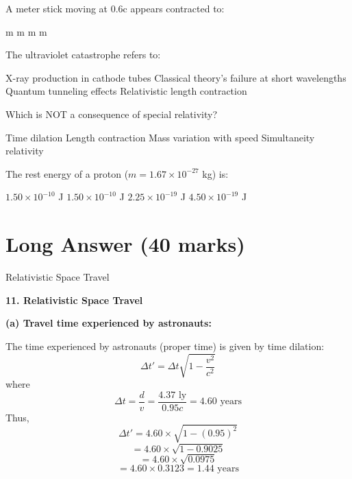 \documentclass[addpoints]{exam}
\begin{document}
\begin{questions}
\question[1] A meter stick moving at 0.6c appears contracted to:
\begin{choices}
     m
     m
     m
     m
\end{choices}

\question[1] The ultraviolet catastrophe refers to:
\begin{choices}
    \choice X-ray production in cathode tubes
    \correctchoice Classical theory's failure at short wavelengths
    \choice Quantum tunneling effects
    \choice Relativistic length contraction
\end{choices}

\question[1] Which is NOT a consequence of special relativity?
\begin{choices}
    \choice Time dilation
    \choice Length contraction
    \correctchoice Mass variation with speed
    \choice Simultaneity relativity
\end{choices}

\question[1] The rest energy of a proton ($m = 1.67 \times 10^{-27}$ kg) is:
\begin{choices}
    \choice $1.50 \times 10^{-10}$ J
    \correctchoice $1.50 \times 10^{-10}$ J
    \choice $2.25 \times 10^{-19}$ J
    \choice $4.50 \times 10^{-19}$ J
\end{choices}

\section*{Long Answer (40 marks)}

\question Relativistic Space Travel
\begin{solution}
    \textbf{11. Relativistic Space Travel}  

\textbf{(a) Travel time experienced by astronauts:}  

The time experienced by astronauts (proper time) is given by time dilation:  
\[
\Delta t' = \Delta t \sqrt{1 - \frac{v^2}{c^2}}
\]
where  
\[
\Delta t = \frac{d}{v} = \frac{4.37 \text{ ly}}{0.95c} = 4.60 \text{ years}
\]
Thus,  
\[
\Delta t' = 4.60 \times \sqrt{1 - (0.95)^2}
\]
\[
= 4.60 \times \sqrt{1 - 0.9025}
\]
\[
= 4.60 \times \sqrt{0.0975}
\]
\[
= 4.60 \times 0.3123 = 1.44 \text{ years}
\]


\end{solution}
\end{questions}
\end{document}
